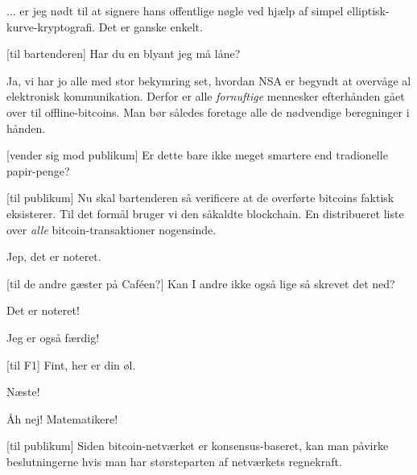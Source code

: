 \documentclass[a4paper,11pt]{article}
\begin{document}
\begin{sketch}
 ... er jeg nødt til at signere hans offentlige nøgle ved hjælp af
simpel elliptisk-kurve-kryptografi. Det er ganske enkelt.

[til bartenderen] Har du en blyant jeg må låne?


 Ja, vi har jo alle med stor bekymring set, hvordan NSA er
begyndt at overvåge al elektronisk kommunikation. Derfor er alle
\textit{fornuftige} mennesker efterhånden gået over til
offline-bitcoins. Man bør således foretage alle de nødvendige
beregninger i hånden.


[vender sig mod publikum] Er dette bare ikke meget smartere
end tradionelle papir-penge?

[til publikum] Nu skal bartenderen så verificere at de
overførte bitcoins faktisk eksisterer. Til det formål bruger vi den
såkaldte blockchain. En distribueret liste over \textit{alle}
bitcoin-transaktioner nogensinde.


 Jep, det er noteret.

[til de andre gæster på Caféen?] Kan I andre ikke også lige så
skrevet det ned?


 Det er noteret!

 Jeg er også færdig!

[til F1] Fint, her er din øl.

 Næste!


 Åh nej! Matematikere!

[til publikum] Siden bitcoin-netværket er konsensus-baseret,
kan man påvirke beslutningerne hvis man har størsteparten af
netværkets regnekraft.


\end{sketch}
\end{document}
